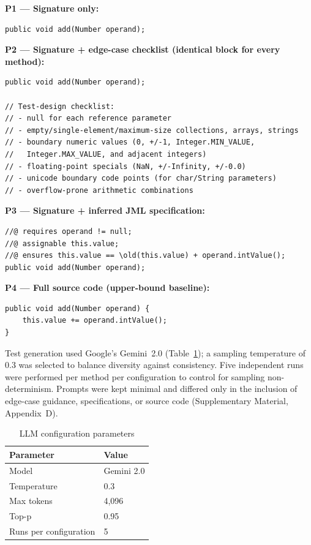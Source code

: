 \begin{listing}[t]
\caption{Worked example of the four phase inputs supplied to the LLM, applied to \texttt{MutableInt.add(Number)} from Apache Commons Lang. The signature is held constant across phases; P2 adds a method-agnostic edge-case checklist, P3 adds the JML contract inferred by JML-Inferrer, and P4 substitutes the full source body.}
\label{lst:phase-example}

\noindent\textbf{P1 --- Signature only:}
\begin{lstlisting}
public void add(Number operand);
\end{lstlisting}

\noindent\textbf{P2 --- Signature + edge-case checklist (identical block for every method):}
\begin{lstlisting}
public void add(Number operand);

// Test-design checklist:
// - null for each reference parameter
// - empty/single-element/maximum-size collections, arrays, strings
// - boundary numeric values (0, +/-1, Integer.MIN_VALUE,
//   Integer.MAX_VALUE, and adjacent integers)
// - floating-point specials (NaN, +/-Infinity, +/-0.0)
// - unicode boundary code points (for char/String parameters)
// - overflow-prone arithmetic combinations
\end{lstlisting}

\noindent\textbf{P3 --- Signature + inferred JML specification:}
\begin{lstlisting}
//@ requires operand != null;
//@ assignable this.value;
//@ ensures this.value == \old(this.value) + operand.intValue();
public void add(Number operand);
\end{lstlisting}

\noindent\textbf{P4 --- Full source code (upper-bound baseline):}
\begin{lstlisting}
public void add(Number operand) {
    this.value += operand.intValue();
}
\end{lstlisting}
\end{listing}

Test generation used Google's Gemini~2.0 (Table~\ref{tab:llm-config}); a sampling temperature of 0.3 was selected to balance diversity against consistency. Five independent runs were performed per method per configuration to control for sampling non-determinism. Prompts were kept minimal and differed only in the inclusion of edge-case guidance, specifications, or source code (Supplementary Material, Appendix~D).

\begin{table}[ht]
\centering
\caption{LLM configuration parameters}
\label{tab:llm-config}
\begin{tabular}{ll}
\toprule
\textbf{Parameter} & \textbf{Value} \\
\midrule
Model & Gemini 2.0 \\
Temperature & 0.3 \\
Max tokens & 4,096 \\
Top-p & 0.95 \\
Runs per configuration & 5 \\
\bottomrule
\end{tabular}
\end{table}


